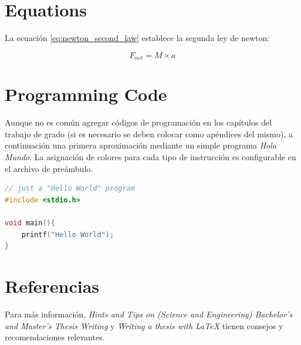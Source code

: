 \section{Equations}

La ecuación \ref{eq:newton_second_law} establece la segunda ley de newton:

\begin{equation}
    F_{net} = M \times a
\label{eq:newton_second_law}
\end{equation}

\section{Programming Code}

Aunque no es común agregar códigos de programación en los capítulos del trabajo de grado (si es necesario se deben colocar como apéndices del mismo), a continuación una primera aproximación mediante un simple programa \textit{Hola Mundo}. La asignación de colores para cada tipo de instrucción es configurable en el archivo de preámbulo.

\begin{lstlisting}[language=C]
// just a "Hello World" program
#include <stdio.h>

void main(){
    printf("Hello World");
}
\end{lstlisting}

\section{Referencias}

Para más información, \textit{Hints and Tips on (Science and Engineering) Bachelor’s and Master’s Thesis Writing} \cite{Thesis_LaTeX_2} y \textit{Writing a thesis with LaTeX} \cite{Thesis_LaTeX} tienen consejos y recomendaciones relevantes.
